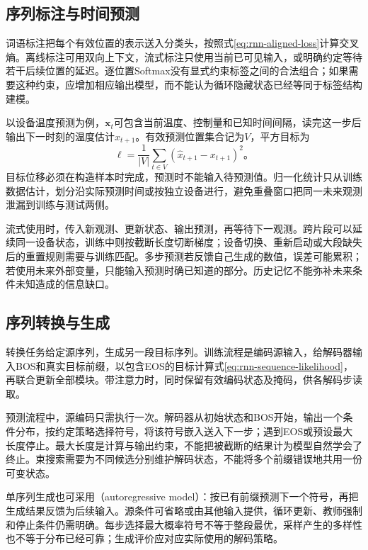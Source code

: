 \subsection{序列标注与时间预测}
\label{sec:rnn-application-aligned}

词语标注把每个有效位置的表示送入分类头，按照式\eqref{eq:rnn-aligned-loss}计算交叉熵。离线标注可用双向上下文，流式标注只使用当前已可见输入，或明确约定等待若干后续位置的延迟。逐位置Softmax没有显式约束标签之间的合法组合；如果需要这种约束，应增加相应输出模型，而不能认为循环隐藏状态已经等同于标签结构建模。

以设备温度预测为例，$\bm{x}_t$可包含当前温度、控制量和已知时间间隔，读完这一步后输出下一时刻的温度估计$\widehat x_{t+1}$。有效预测位置集合记为$V$，平方目标为
\begin{equation}
  \ell=\frac{1}{|V|}\sum_{t\in V}
      (\widehat x_{t+1}-x_{t+1})^2\text{。}
  \label{eq:rnn-forecast-loss}
\end{equation}
目标位移必须在构造样本时完成，预测时不能输入待预测值。归一化统计只从训练数据估计，划分沿实际预测时间或按独立设备进行，避免重叠窗口把同一未来观测泄漏到训练与测试两侧。

流式使用时，传入新观测、更新状态、输出预测，再等待下一观测。跨片段可以延续同一设备状态，训练中则按截断长度切断梯度；设备切换、重新启动或大段缺失后的重置规则需要与训练匹配。多步预测若反馈自己生成的数值，误差可能累积；若使用未来外部变量，只能输入预测时确已知道的部分。历史记忆不能弥补未来条件未知造成的信息缺口。

\subsection{序列转换与生成}
\label{sec:rnn-application-generation}

转换任务给定源序列，生成另一段目标序列。训练流程是编码源输入，给解码器输入BOS和真实目标前缀，以包含EOS的目标计算式\eqref{eq:rnn-sequence-likelihood}，再联合更新全部模块。带注意力时，同时保留有效编码状态及掩码，供各解码步读取。

预测流程中，源编码只需执行一次。解码器从初始状态和BOS开始，输出一个条件分布，按约定策略选择符号，将该符号嵌入送入下一步；遇到EOS或预设最大长度停止。最大长度是计算与输出约束，不能把被截断的结果计为模型自然学会了终止。束搜索需要为不同候选分别维护解码状态，不能将多个前缀错误地共用一份可变状态。

单序列生成也可采用（autoregressive model）：按已有前缀预测下一个符号，再把生成结果反馈为后续输入。源条件可省略或由其他输入提供，循环更新、教师强制和停止条件仍需明确。每步选择最大概率符号不等于整段最优，采样产生的多样性也不等于分布已经可靠；生成评价应对应实际使用的解码策略。

